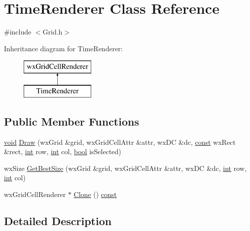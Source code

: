 \hypertarget{class_time_renderer}{}\section{Time\+Renderer Class Reference}
\label{class_time_renderer}


{\ttfamily \#include $<$Grid.\+h$>$}

Inheritance diagram for Time\+Renderer\+:\begin{figure}[H]
\begin{center}
\leavevmode
\includegraphics[height=2.000000cm]{class_time_renderer}
\end{center}
\end{figure}
\subsection*{Public Member Functions}
\begin{DoxyCompactItemize}
\item 
\hyperlink{sound_8c_ae35f5844602719cf66324f4de2a658b3}{void} \hyperlink{class_time_renderer_ab76045f2a54badf301405e23a4da5ceb}{Draw} (wx\+Grid \&grid, wx\+Grid\+Cell\+Attr \&attr, wx\+DC \&dc, \hyperlink{getopt1_8c_a2c212835823e3c54a8ab6d95c652660e}{const} wx\+Rect \&rect, \hyperlink{xmltok_8h_a5a0d4a5641ce434f1d23533f2b2e6653}{int} row, \hyperlink{xmltok_8h_a5a0d4a5641ce434f1d23533f2b2e6653}{int} col, \hyperlink{mac_2config_2i386_2lib-src_2libsoxr_2soxr-config_8h_abb452686968e48b67397da5f97445f5b}{bool} is\+Selected)
\item 
wx\+Size \hyperlink{class_time_renderer_a56b8711f4af88c0e6b46a05aed60d44c}{Get\+Best\+Size} (wx\+Grid \&grid, wx\+Grid\+Cell\+Attr \&attr, wx\+DC \&dc, \hyperlink{xmltok_8h_a5a0d4a5641ce434f1d23533f2b2e6653}{int} row, \hyperlink{xmltok_8h_a5a0d4a5641ce434f1d23533f2b2e6653}{int} col)
\item 
wx\+Grid\+Cell\+Renderer $\ast$ \hyperlink{class_time_renderer_a37d2ef0b99203f0167f4df5abbc660f6}{Clone} () \hyperlink{getopt1_8c_a2c212835823e3c54a8ab6d95c652660e}{const} 
\end{DoxyCompactItemize}


\subsection{Detailed Description}


